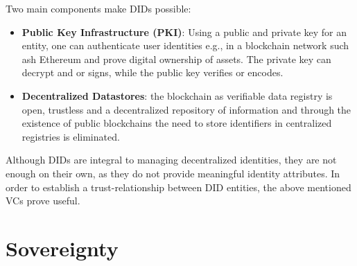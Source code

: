 Two main components make DIDs possible: \cite{eth-decentralized-identity}
\begin{itemize}
	\item \textbf{Public Key Infrastructure (PKI)}: Using a public and private key for an entity, one can
	      authenticate user identities e.g., in a blockchain network such ash Ethereum and prove digital ownership
	      of assets.
	      The private key can decrypt and or signs, while the public key verifies or encodes.
	\item \textbf{Decentralized Datastores}: the blockchain as verifiable data registry is open, trustless and a
	      decentralized repository of information and through the existence of public blockchains the need to store
	      identifiers in centralized registries is eliminated.
\end{itemize}

Although DIDs are integral to managing decentralized identities, they are not enough on their own, as they do not
provide meaningful identity attributes. In order to establish a trust-relationship between DID entities, the above
mentioned VCs prove useful. \cite{w3c2019verifiablecredentials}



\section{Sovereignty} %
\label{sec:Sovereignty}

